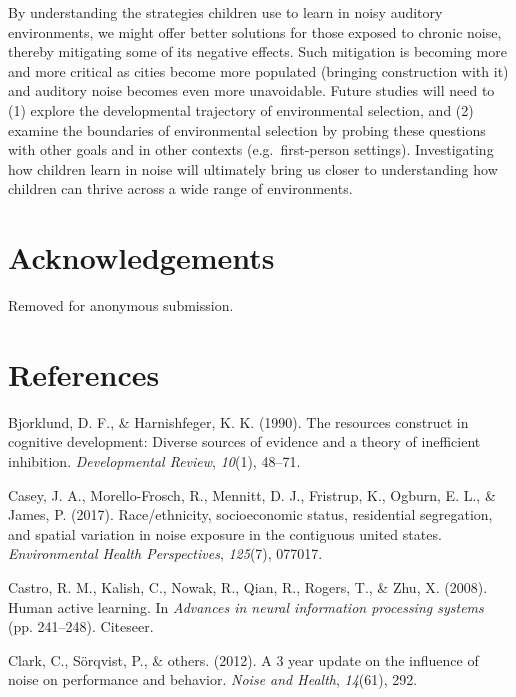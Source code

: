 \documentclass[10pt, letterpaper]{article}
\begin{document}
By understanding the strategies children use to learn in noisy auditory
environments, we might offer better solutions for those exposed to
chronic noise, thereby mitigating some of its negative effects. Such
mitigation is becoming more and more critical as cities become more
populated (bringing construction with it) and auditory noise becomes
even more unavoidable. Future studies will need to (1) explore the
developmental trajectory of environmental selection, and (2) examine the
boundaries of environmental selection by probing these questions with
other goals and in other contexts (e.g.~first-person settings).
Investigating how children learn in noise will ultimately bring us
closer to understanding how children can thrive across a wide range of
environments.

\hypertarget{acknowledgements}{%
\section{Acknowledgements}\label{acknowledgements}}

Removed for anonymous submission.

\hypertarget{references}{%
\section{References}\label{references}}

\setlength{\parindent}{-0.1in} 
\setlength{\leftskip}{0.125in}

\noindent

\hypertarget{refs}{}
\leavevmode\hypertarget{ref-bjorklund1990}{}%
Bjorklund, D. F., \& Harnishfeger, K. K. (1990). The resources construct
in cognitive development: Diverse sources of evidence and a theory of
inefficient inhibition. \emph{Developmental Review}, \emph{10}(1),
48--71.

\leavevmode\hypertarget{ref-casey2017}{}%
Casey, J. A., Morello-Frosch, R., Mennitt, D. J., Fristrup, K., Ogburn,
E. L., \& James, P. (2017). Race/ethnicity, socioeconomic status,
residential segregation, and spatial variation in noise exposure in the
contiguous united states. \emph{Environmental Health Perspectives},
\emph{125}(7), 077017.

\leavevmode\hypertarget{ref-castro2008}{}%
Castro, R. M., Kalish, C., Nowak, R., Qian, R., Rogers, T., \& Zhu, X.
(2008). Human active learning. In \emph{Advances in neural information
processing systems} (pp. 241--248). Citeseer.

\leavevmode\hypertarget{ref-clark20123}{}%
Clark, C., Sörqvist, P., \& others. (2012). A 3 year update on the
influence of noise on performance and behavior. \emph{Noise and Health},
\emph{14}(61), 292.
\end{document}
